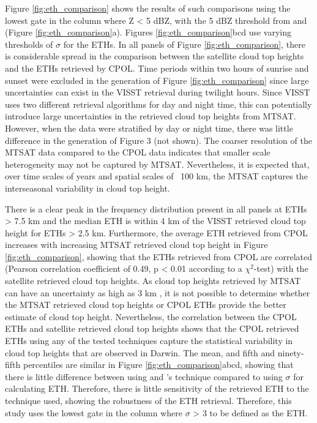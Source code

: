 \documentclass[journal abbreviation, manuscript]{copernicus}
\begin{document}
    Figure \ref{fig:eth_comparison} shows the results of such comparisons using the lowest gate in the column where Z < 5 dBZ, with the 5 dBZ threshold from \cite{MayandBallinger2006} and \cite{Kumaretal2013} (Figure \ref{fig:eth_comparison}a). Figures \ref{fig:eth_comparison}bcd use varying thresholds of $\sigma$ for the ETHs. In all panels of Figure \ref{fig:eth_comparison}, there is considerable spread in the comparison between the satellite cloud top heights and the ETHs retrieved by CPOL. Time periods within two hours of sunrise and sunset were excluded in the generation of Figure \ref{fig:eth_comparison} since large uncertainties can exist in the VISST retrieval during twilight hours. Since VISST uses two different retrieval algorithms for day and night time, this can potentially introduce large uncertainties in the retrieved cloud top heights from MTSAT. However, when the data were stratified by day or night time, there was little difference in the generation of Figure 3 (not shown). The coarser resolution of the MTSAT data compared to the CPOL data indicates that smaller scale heterogeneity may not be captured by MTSAT. Nevertheless, it is expected that, over time scales of years and spatial scales of ~100 km, the MTSAT captures the interseasonal variability in cloud top height. 
    
    There is a clear peak in the frequency distribution present in all panels at ETHs > 7.5 km and the median ETH is within 4 km of the VISST retrieved cloud top height for ETHs > 2.5 km. Furthermore, the average ETH retrieved from CPOL increases with increasing MTSAT retrieved cloud top height in Figure \ref{fig:eth_comparison}, showing that the ETHs retrieved from CPOL are correlated (Pearson correlation coefficient of 0.49, p < 0.01 according to a $\chi^{2}$-test) with the satellite retrieved cloud top heights. As cloud top heights retrieved by MTSAT can have an uncertainty as high as 3 km \citep{HamadaandNishi2010}, it is not possible to determine whether the MTSAT retrieved cloud top heights or CPOL ETHs provide the better estimate of cloud top height. Nevertheless, the correlation between the CPOL ETHs and satellite retrieved cloud top heights shows that the CPOL retrieved ETHs using any of the tested techniques capture the statistical variability in cloud top heights that are observed in Darwin. The mean, and fifth and ninety-fifth percentiles are similar in Figure \ref{fig:eth_comparison}abcd, showing that there is little difference between using \cite{MayandBallinger2006} and \cite{Kumaretal2013}'s technique compared to using $\sigma$ for calculating ETH. Therefore, there is little sensitivity of the retrieved ETH to the technique used, showing the robustness of the ETH retrieval. Therefore, this study uses the lowest gate in the column where $\sigma$ > 3 to be defined as the ETH. 
    
\end{document}
